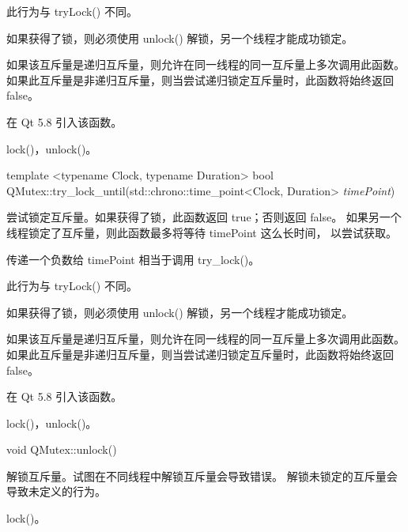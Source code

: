 此行为与 tryLock() 不同。

如果获得了锁，则必须使用 unlock() 解锁，另一个线程才能成功锁定。

如果该互斥量是递归互斥量，则允许在同一线程的同一互斥量上多次调用此函数。
如果此互斥量是非递归互斥量，则当尝试递归锁定互斥量时，此函数将始终返回 false。

在 Qt 5.8 引入该函数。

\begin{seeAlso}
lock()，unlock()。
\end{seeAlso}

template <typename Clock, typename Duration> bool QMutex::try\_lock\_until(std::chrono::time\_point<Clock, Duration> \emph{timePoint})

尝试锁定互斥量。如果获得了锁，此函数返回 true；否则返回 false。
如果另一个线程锁定了互斥量，则此函数最多将等待 timePoint 这么长时间，
以尝试获取。

\begin{notice}
传递一个负数给 timePoint 相当于调用 try\_lock()。
\end{notice}

此行为与 tryLock() 不同。

如果获得了锁，则必须使用 unlock() 解锁，另一个线程才能成功锁定。

如果该互斥量是递归互斥量，则允许在同一线程的同一互斥量上多次调用此函数。
如果此互斥量是非递归互斥量，则当尝试递归锁定互斥量时，此函数将始终返回 false。

在 Qt 5.8 引入该函数。

\begin{seeAlso}
lock()，unlock()。
\end{seeAlso}

void QMutex::unlock()

解锁互斥量。试图在不同线程中解锁互斥量会导致错误。
解锁未锁定的互斥量会导致未定义的行为。

\begin{seeAlso}
lock()。
\end{seeAlso}

